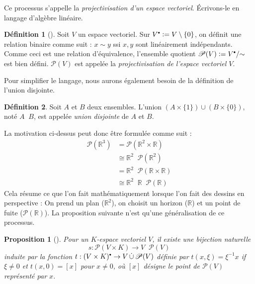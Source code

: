 \documentclass[12pt, oneside]{memoir}
\newtheorem{prop}{Proposition}
\theoremstyle{definition}
\newtheorem{defn}{Définition}
\newcommand{\unbutton}[1][.6]{\mathbin{\vcenter{\hbox{\scalebox{#1}{$\bullet$}}}}}
\newcommand{\defeq}{\vcentcolon=}
\newcommand{\set}[1]{\{ #1 \}}
\newcommand{\proj}{\boldsymbol{\mathscr{P}}}
\newcommand{\discup}{\mathop{\dot{\cup}}}
\newcommand{\R}{\mathbb{R}}
\begin{document}
Ce processus s'appelle la \textit{projectivisation d'un espace
  vectoriel}. Écrivons-le en langage d'algèbre linéaire.
\begin{defn}[{\cite[27]{ff00}}]
  Soit $V$ un espace vectoriel. Sur
  $V^{\unbutton} \defeq V \setminus \set{0}$, on définit une relation
  binaire comme suit : $x \sim y$ ssi $x, y$ sont linéairement
  indépendants. Comme ceci est une relation d'équivalence, l'ensemble
  quotient $\proj(V) \defeq V^{\unbutton} / {\sim}$ est bien
  défini. $\proj(V)$ est appelée la \textit{projectivisation de
    l'espace vectoriel $V$}.
\end{defn}
Pour simplifier le langage, nous aurons également besoin de la
définition de l'union disjointe.
\begin{defn}
  Soit $A$ et $B$ deux ensembles. L'union
  $(A \times \set{1}) \cup (B \times \set{0})$, noté $A \discup B$, est
  appelée \textit{union disjointe} de $A$ et $B$.
\end{defn}
La motivation ci-dessus peut donc être formulée comme suit :
\begin{align*}
  \label{eq:embedding}
  \proj(\R^3) &= \proj(\R^2 \times \R) \\
              &\cong \R^2 \discup \proj(\R^2) \\
              &= \R^2 \discup \proj(\R \times \R) \\
              &\cong \R^2 \discup \R \discup \proj(\R)
\end{align*}
Cela résume ce que l'on fait mathématiquement lorsque l'on fait des
dessins en perspective : On prend un plan ($\R^2$), on choisit un
horizon ($\R$) et un point de fuite ($\proj(\R)$). La proposition
suivante n'est qu'une généralisation de ce processus.
\begin{prop}[{\cite[28]{ff00}}]
  Pour un $K$-espace vectoriel $V$, il existe une bijection naturelle
  \begin{equation*}
    \label{natural-bijection}
    s: \proj(V \times K) \to V \discup \proj(V)
  \end{equation*}
  induite par la fonction
  $t: (V \times K)^{\unbutton} \to V \discup \proj(V)$ définie par
  $t(x,\xi) = \xi^{-1}x$ if $\xi \neq 0$ et $t(x,0) = [x]$ pour
  $x \neq 0$, où $[x]$ désigne le point de $\proj(V)$ représenté par
  $x$.
\end{prop}
\end{document}
